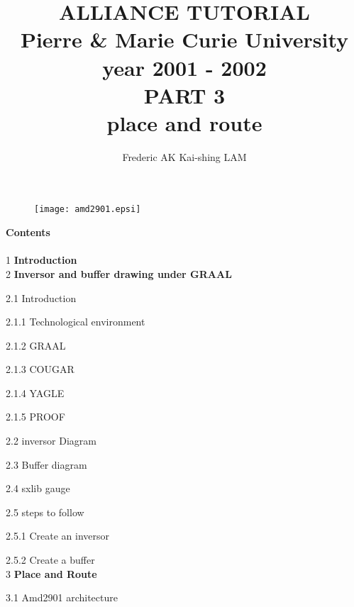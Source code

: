 \documentclass[12pt]{article}
\begin{document}
\title{
               {\Huge ALLIANCE TUTORIAL \\}
    {\large
               Pierre \& Marie Curie University \\
                    year 2001 - 2002\\
    }
    \vspace{1cm}
    {\huge
                      PART 3\\
    		place and route
    }
}
\date{}
\author{
              Frederic AK\hspace{2cm} Kai-shing LAM
}

\maketitle
\begin{figure}[H]\centering
  \texttt{[image: amd2901.epsi]}
\end{figure}

\thispagestyle{empty}
\def\myfbox#1{\vspace*{3mm}\fbox{#1}\vspace{3mm}}
\newpage
{\bf Contents}\\
\\
{1} {\bf Introduction}
\\
{2 }{\bf Inversor and buffer drawing under GRAAL}

{2.1} Introduction

\hspace{0.5cm} {2.1.1} Technological environment

\hspace{0.5cm} {2.1.2} GRAAL

\hspace{0.5cm} {2.1.3} COUGAR

\hspace{0.5cm} {2.1.4} YAGLE

\hspace{0.5cm} {2.1.5} PROOF

{2.2} inversor Diagram

{2.3} Buffer diagram 

{2.4} sxlib gauge

{2.5} steps to follow

\hspace{0.5cm}  {2.5.1} Create an inversor

\hspace{0.5cm}  {2.5.2} Create a buffer
\\
{3} {\bf Place and Route}

{3.1} Amd2901 architecture
\end{document}
